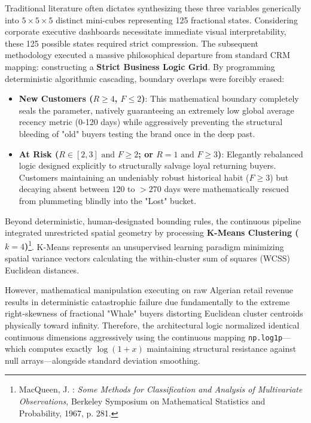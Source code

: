 \documentclass[12pt,a4paper]{report}
\begin{document}
Traditional literature often dictates synthesizing these three variables generically into $5 \times 5 \times 5$ distinct mini-cubes representing 125 fractional states. Considering corporate executive dashboards necessitate immediate visual interpretability, these 125 possible states required strict compression. The subsequent methodology executed a massive philosophical departure from standard CRM mapping: constructing a \textbf{Strict Business Logic Grid}. By programming deterministic algorithmic cascading, boundary overlaps were forcibly erased:
\begin{itemize}
    \item \textbf{New Customers ($R \geq 4$, $F \leq 2$)}: This mathematical boundary completely seals the parameter, natively guaranteeing an extremely low global average recency metric (0-120 days) while aggressively preventing the structural bleeding of "old" buyers testing the brand once in the deep past.
    \item \textbf{At Risk ($R \in [2, 3] \text{ and } F \geq 2$; or $R = 1 \text{ and } F \geq 3$)}: Elegantly rebalanced logic designed explicitly to structurally salvage loyal returning buyers. Customers maintaining an undeniably robust historical habit ($F \geq 3$) but decaying absent between $120$ to $>270$ days were mathematically rescued from plummeting blindly into the "Lost" bucket.
\end{itemize}

Beyond deterministic, human-designated bounding rules, the continuous pipeline integrated unrestricted spatial geometry by processing \textbf{K-Means Clustering ($k=4$)}\footnote{MacQueen, J. : \textit{Some Methods for Classification and Analysis of Multivariate Observations}, Berkeley Symposium on Mathematical Statistics and Probability, 1967, p. 281.}. K-Means represents an unsupervised learning paradigm minimizing spatial variance vectors calculating the within-cluster sum of squares (WCSS) Euclidean distances. 

However, mathematical manipulation executing on raw Algerian retail revenue results in deterministic catastrophic failure due fundamentally to the extreme right-skewness of fractional "Whale" buyers distorting Euclidean cluster centroids physically toward infinity. Therefore, the architectural logic normalized identical continuous dimensions aggressively using the continuous mapping \texttt{np.log1p}—which computes exactly $\log(1+x)$ maintaining structural resistance against null arrays—alongside standard deviation smoothing.
\end{document}
